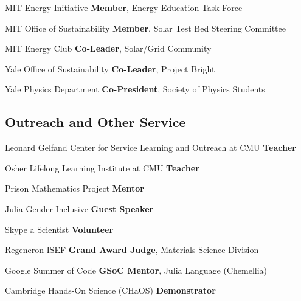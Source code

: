 {MIT Energy Initiative}
{\textbf{Member}, Energy Education Task Force}
{}

{MIT Office of Sustainability}
{\textbf{Member}, Solar Test Bed Steering Committee}
{}

{MIT Energy Club}
{\textbf{Co-Leader}, Solar/Grid Community}
{}

{Yale Office of Sustainability}
{\textbf{Co-Leader}, Project Bright}
{}

{Yale Physics Department}
{\textbf{Co-President}, Society of Physics Students}
{}

\vspace{-2mm}
\subsection{Outreach and Other Service}
                      {Leonard Gelfand Center for Service Learning and Outreach at CMU}
                      {\textbf{Teacher}}{}

                      {Osher Lifelong Learning Institute at CMU}
                      {\textbf{Teacher}}{}
                     

{Prison Mathematics Project}
{\textbf{Mentor}}
{}

{Julia Gender Inclusive}
{\textbf{Guest Speaker}}
{}

{Skype a Scientist}
{\textbf{Volunteer}}
{}

{Regeneron ISEF}
{\textbf{Grand Award Judge}, Materials Science Division}
{}

{Google Summer of Code}
{\textbf{GSoC Mentor}, Julia Language (Chemellia)}
{}

{Cambridge Hands-On Science (CHaOS)}
{\textbf{Demonstrator}}
{}
